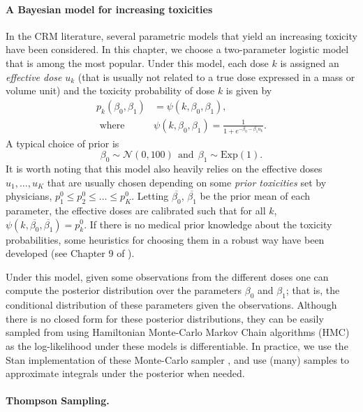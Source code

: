 \paragraph{A Bayesian model for increasing toxicities} In the CRM literature, several parametric models that yield an increasing toxicity have been considered. In this chapter, we choose a two-parameter logistic model that is among the most popular. Under this model, each dose $k$ is assigned an \emph{effective dose} $u_k$ (that is usually not related to a true dose expressed in a mass or volume unit) and the toxicity probability of dose $k$ is given by 
\begin{align*}
p_k(\beta_0,\beta_1) &= \psi(k,\beta_0,\beta_1),
\\
 \text{ where } \
&\psi(k,\beta_0,\beta_1) = \frac{1}{1 + e^{-\beta_0-\beta_1u_k}}.
\end{align*}
A typical choice of prior is 
\[
\beta_0 \sim \mathcal{N}(0,100) \ \ \text{and} \ \ \beta_1 \sim \mathrm{Exp}(1). \]
It is worth noting that this model also heavily relies on the effective doses $u_1,\dots,u_K$ that are usually chosen depending on some \emph{prior toxicities} set by physicians, $p^0_1 \leq p^0_2 \leq \dots \leq p^0_K$. Letting $\overline{\beta_0}$, $\overline{\beta_1}$ be the prior mean of each parameter, the effective doses are calibrated such that for all $k$, $\psi(k,\overline{\beta_0},\overline{\beta_1}) = p_k^0$. If there is no medical prior knowledge about the toxicity probabilities, some heuristics for choosing them in a robust way have been developed (see Chapter 9 of \cite{CRMBook}).%
  
Under this model, given some observations from the different doses one can compute the posterior distribution over the parameters $\beta_0$ and $\beta_1$; that is, the conditional distribution of these parameters given the observations. Although there is no closed form for these posterior distributions, they can be easily sampled from using Hamiltonian Monte-Carlo Markov Chain algorithms (HMC) as the log-likelihood under these models is differentiable. In practice, we use the Stan implementation of these Monte-Carlo sampler \citep{StanManual}, and use (many) samples to approximate integrals under the posterior when needed.    
 
\paragraph{Thompson Sampling.}

